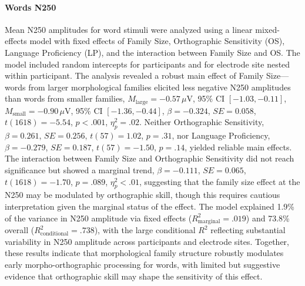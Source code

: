 \documentclass[utf8]{FrontiersinHarvard} %
\begin{document}
\paragraph*{Words N250}
Mean N250 amplitudes for word stimuli were analyzed using a linear mixed-effects model with fixed effects of Family Size, Orthographic Sensitivity (OS), Language Proficiency (LP), and the interaction between Family Size and OS. The model included random intercepts for participants and for electrode site nested within participant. The analysis revealed a robust main effect of Family Size—words from larger morphological families elicited less negative N250 amplitudes than words from smaller families, $M_{\mathrm{large}} = -0.57\,\mu$V, 95\% CI $[-1.03, -0.11]$, $M_{\mathrm{small}} = -0.90\,\mu$V, 95\% CI $[-1.36, -0.44]$, $\beta = -0.324$, $SE = 0.058$, $t(1618) = -5.54$, $p < .001$, $\eta^2_p = .02$. Neither Orthographic Sensitivity, $\beta = 0.261$, $SE = 0.256$, $t(57) = 1.02$, $p = .31$, nor Language Proficiency, $\beta = -0.279$, $SE = 0.187$, $t(57) = -1.50$, $p = .14$, yielded reliable main effects. The interaction between Family Size and Orthographic Sensitivity did not reach significance but showed a marginal trend, $\beta = -0.111$, $SE = 0.065$, $t(1618) = -1.70$, $p = .089$, $\eta^2_p < .01$, suggesting that the family size effect at the N250 may be modulated by orthographic skill, though this requires cautious interpretation given the marginal status of the effect. The model explained 1.9\% of the variance in N250 amplitude via fixed effects ($R^2_{\mathrm{marginal}} = .019$) and 73.8\% overall ($R^2_{\mathrm{conditional}} = .738$), with the large conditional $R^2$ reflecting substantial variability in N250 amplitude across participants and electrode sites. Together, these results indicate that morphological family structure robustly modulates early morpho-orthographic processing for words, with limited but suggestive evidence that orthographic skill may shape the sensitivity of this effect.
\end{document}
